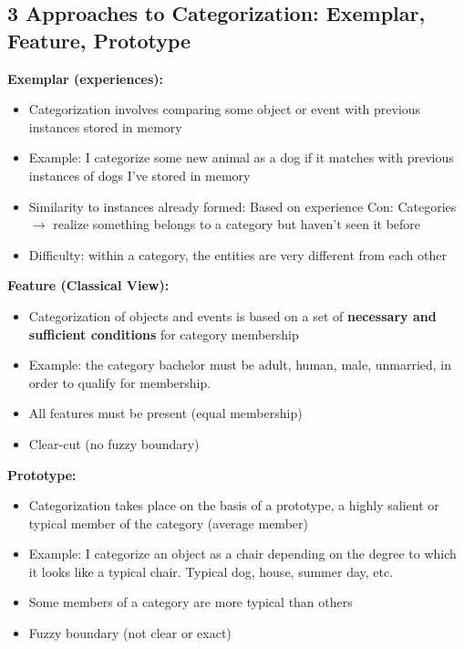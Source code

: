 \documentclass{article}
\begin{document}
\subsection{3 Approaches to Categorization: Exemplar, Feature, Prototype}

\noindent \textbf{Exemplar (experiences):}
\begin{itemize}
    \item Categorization involves comparing some object or event with previous instances stored in memory 
    \item Example: I categorize some new animal as a dog if it matches with previous instances of dogs I've stored in memory
    \item Similarity to instances already formed: 
        \subitem Based on experience
        \subitem Con: Categories $\rightarrow$ realize something belongs to a category but haven't seen it before
    \item Difficulty: within a category, the entities are very different from each other
\end{itemize}

\noindent \textbf{Feature (Classical View):}
\begin{itemize}
    \item Categorization of objects and events is based on a set of \textbf{necessary and sufficient conditions} for category membership
    \item Example: the category bachelor must be adult, human, male, unmarried, in order to qualify for membership. 
    \item All features must be present (equal membership)
    \item Clear-cut (no fuzzy boundary)
\end{itemize}

\noindent \textbf{Prototype:}
\begin{itemize}
    \item Categorization takes place on the basis of a prototype, a highly salient or typical member of the category (average member)
    \item Example: I categorize an object as a chair depending on the degree to which it looks like a typical chair. Typical dog, house, summer day, etc. 
    \item Some members of a category are more typical than others 
    \item Fuzzy boundary (not clear or exact)
\end{itemize}
\end{document}
